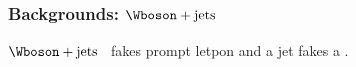 \begin{frame}
\frametitle{Backgrounds: $\Wboson+\text{jets}$}
\begin{block}{$\Wboson+\text{jets}$}
\Wboson\ fakes prompt letpon and a jet fakes a \tauh.
\end{block}
\end{frame}